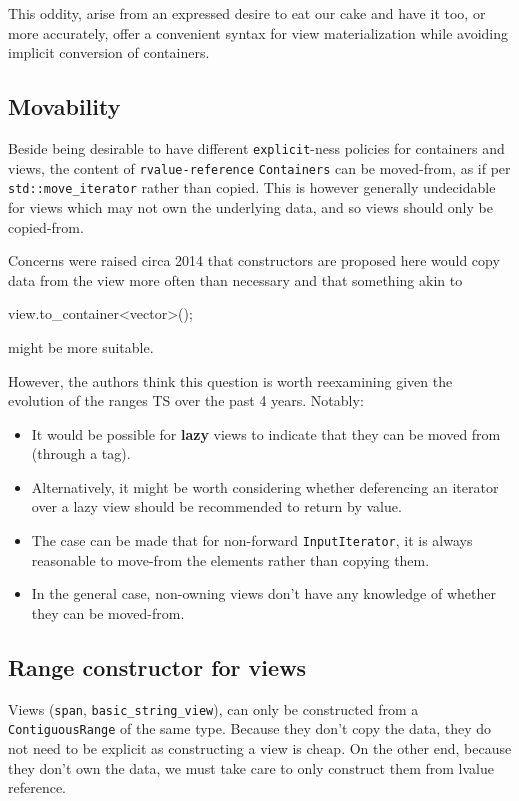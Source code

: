 \documentclass{wg21}
\newcommand{\cc}[1]{\texttt{#1}}
\begin{document}
This oddity, arise from an expressed desire to eat our cake and have it too, or more accurately, offer a convenient syntax for view materialization while avoiding implicit conversion of containers.

\subsection{Movability}

Beside being desirable to have different \cc{explicit}-ness policies for containers and views, the content of \cc{rvalue-reference} \cc{Containers}
can be moved-from, as if per \cc{std::move_iterator} rather than copied.
This is however generally undecidable for views which may not own the underlying data, and so views should only be copied-from.

Concerns were raised circa 2014 that constructors are proposed here would copy data from the view more often than necessary and that something akin to
\begin{codeblock}
view.to_container<vector>();
\end{codeblock}
might be more suitable.

However, the authors think this question is worth reexamining given the evolution of the ranges TS over the past 4 years.
Notably:
\begin{itemize}
	\item It would be possible for \textbf{lazy} views to indicate that they can be moved from (through a tag).
	\item Alternatively, it might be worth considering whether deferencing an iterator over a lazy view should be recommended to return by value.
	\item The case can be made that for non-forward \cc{InputIterator}, it is always reasonable to move-from the elements rather than copying them.
	\item In the general case, non-owning views don't have any knowledge of whether they can be moved-from.
\end{itemize}



\subsection{Range constructor for views}

Views (\cc{span}, \cc{basic_string_view}), can only be constructed from a \cc{ContiguousRange} of the same type.
Because they don't copy the data, they do not need to be explicit as constructing a view is cheap.
On the other end, because they don't own the data, we must take care to only construct them from lvalue reference.
\end{document}

